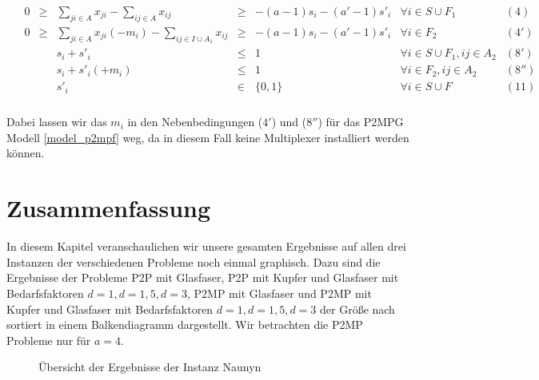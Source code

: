 \documentclass[11pt,a4paper]{article}
\theoremstyle{my_th_style1}
\begin{document}
  \begin{align*}
  \begin{array}{rcrcrcll}
  &0&\geq&\displaystyle\sum_{ji \in A} x_{ji} - \displaystyle\sum_{ij \in A} x_{ij}&\geq& -(a-1)s_i -(a'-1)s'_i & \forall i \in S \cup F_1& (4)\\
  &0&\geq&\displaystyle\sum_{ji \in A} x_{ji} (-m_i) - \displaystyle\sum_{ij \in I \cup A_1} x_{ij}&\geq& -(a-1)s_i -(a'-1)s'_i & \forall i \in F_2& (4')\\
    &&&s_i+s'_i & \leq &1 & \forall i \in S \cup F_1,ij\in A_2& (8')\\
  &&&s_i+s'_i(+m_i) & \leq &1 & \forall i \in F_2,ij\in A_2 &   (8'')\\
  &&& s'_i & \in & \{ 0,1 \} & \forall i \in S \cup F & (11) \\
  \end{array}
  \end{align*}

Dabei lassen wir das \(m_i\) in den Nebenbedingungen (\(4'\)) und (\(8''\)) f\"ur das P2MPG Modell \eqref{model_p2mpf} weg, da in diesem Fall keine Multiplexer installiert werden k\"onnen.
 
 \section{Zusammenfassung}
In diesem Kapitel veranschaulichen wir unsere gesamten Ergebnisse auf allen drei Instanzen der verschiedenen Probleme noch einmal graphisch. Dazu sind die Ergebnisse der Probleme P2P mit Glasfaser, P2P mit Kupfer und Glasfaser mit Bedarfsfaktoren $d=1, d=1,5, d=3$, P2MP mit Glasfaser und P2MP mit Kupfer und Glasfaser mit Bedarfsfaktoren $d=1, d=1,5, d=3$ der Größe nach sortiert in einem Balkendiagramm dargestellt. Wir betrachten die P2MP Probleme nur für $a=4$.

  \begin{figure}[!htbp]
  	\centering
 	\caption{\"Ubersicht der Ergebnisse der Instanz Naunyn}
 \end{figure}
 
\end{document}
